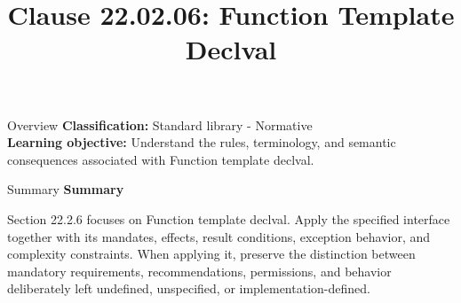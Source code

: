 \documentclass[10pt,letterpaper]{article}
\title{Clause 22.02.06: Function Template Declval}
\author{}
\date{}
\begin{document}
\maketitle
\begin{CornellOverviewBox}{Overview}
\textbf{Classification:} Standard library - Normative\\[2pt]
\textbf{Learning objective:} Understand the rules, terminology, and semantic consequences associated with Function template declval.
\end{CornellOverviewBox}\begin{CornellSummaryBox}{Summary}
{\sffamily\bfseries\color{Accent} Summary}\par\vspace{3pt}Section 22.2.6 focuses on Function template declval. Apply the specified interface together with its mandates, effects, result conditions, exception behavior, and complexity constraints. When applying it, preserve the distinction between mandatory requirements, recommendations, permissions, and behavior deliberately left undefined, unspecified, or implementation-defined.
\end{CornellSummaryBox}
\end{document}
